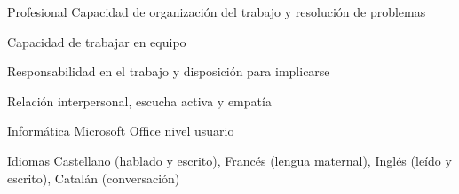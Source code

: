 

\begin{cvskills}

  \cvskill
    {Profesional} %
    {Capacidad de organización del trabajo y resolución de problemas} %

  \cvskill
    {} %
    {Capacidad de trabajar en equipo} %

  \cvskill
    {} %
    {Responsabilidad en el trabajo y disposición para implicarse} %

  \cvskill
    {} %
    {Relación interpersonal, escucha activa y empatía} %

  \cvskill
    {Informática} %
    {Microsoft Office nivel usuario} %

  \cvskill
    {Idiomas} %
    {Castellano (hablado y escrito), Francés (lengua maternal), Inglés (leído y escrito), Catalán (conversación)} %

\end{cvskills}
